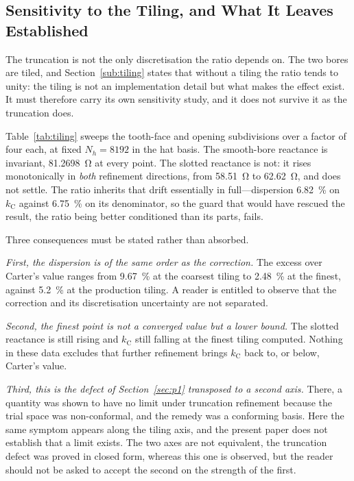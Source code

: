 \documentclass[10pt,a4paper,twocolumn]{article}
\theoremstyle{plain}
\theoremstyle{remark}
\begin{document}
\subsection{Sensitivity to the Tiling, and What It Leaves Established}
\label{sub:tilesens}

The truncation is not the only discretisation the ratio depends on. The
two bores are tiled, and Section~\ref{sub:tiling} states that without a
tiling the ratio tends to unity: the tiling is not an implementation
detail but what makes the effect exist. It must therefore carry its own
sensitivity study, and it does not survive it as the truncation does.

Table~\ref{tab:tiling} sweeps the tooth-face and opening subdivisions
over a factor of four each, at fixed $N_h=\num{8192}$ in the hat basis.
The smooth-bore reactance is invariant, \SI{81.2698}{\ohm} at every
point. The slotted reactance is not: it rises monotonically in
\emph{both} refinement directions, from \SI{58.51}{\ohm} to
\SI{62.62}{\ohm}, and does not settle. The ratio inherits that drift
essentially in full---dispersion \SI{6.82}{\percent} on $k_{\mathrm{C}}$
against \SI{6.75}{\percent} on its denominator, so the guard that would
have rescued the result, the ratio being better conditioned than its
parts, fails.

Three consequences must be stated rather than absorbed.

\emph{First, the dispersion is of the same order as the correction.} The
excess over Carter's value ranges from \SI{+9.67}{\percent} at the
coarsest tiling to \SI{+2.48}{\percent} at the finest, against
\SI{+5.2}{\percent} at the production tiling. A reader is entitled to
observe that the correction and its discretisation uncertainty are not
separated.

\emph{Second, the finest point is not a converged value but a lower
bound.} The slotted reactance is still rising and $k_{\mathrm{C}}$ still
falling at the finest tiling computed. Nothing in these data excludes
that further refinement brings $k_{\mathrm{C}}$ back to, or below,
Carter's value.

\emph{Third, this is the defect of Section~\ref{sec:p1} transposed to a
second axis.} There, a quantity was shown to have no limit under
truncation refinement because the trial space was non-conformal, and the
remedy was a conforming basis. Here the same symptom appears along the
tiling axis, and the present paper does not establish that a limit
exists. The two axes are not equivalent, the truncation defect was
proved in closed form, whereas this one is observed, but the reader
should not be asked to accept the second on the strength of the first.
\end{document}
